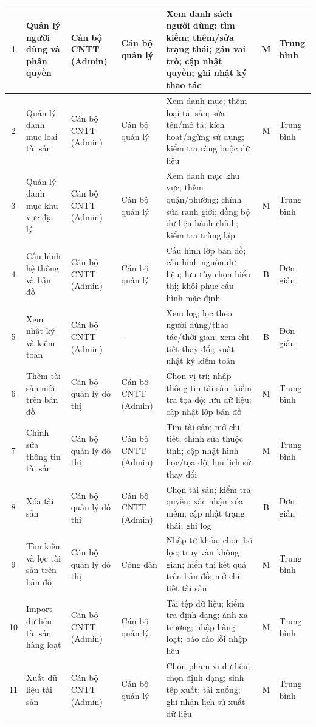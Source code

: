 \begin{longtable}{|c|p{3.2cm}|p{2.0cm}|p{2.0cm}|p{4.8cm}|c|p{1.5cm}|}
    1 & Quản lý người dùng và phân quyền & Cán bộ CNTT (Admin) & Cán bộ quản lý & Xem danh sách người dùng; tìm kiếm; thêm/sửa trạng thái; gán vai trò; cập nhật quyền; ghi nhật ký thao tác & M & Trung bình \\ \hline
    2 & Quản lý danh mục loại tài sản & Cán bộ CNTT (Admin) & Cán bộ quản lý & Xem danh mục; thêm loại tài sản; sửa tên/mô tả; kích hoạt/ngừng sử dụng; kiểm tra ràng buộc dữ liệu & M & Trung bình \\ \hline
    3 & Quản lý danh mục khu vực địa lý & Cán bộ CNTT (Admin) & Cán bộ quản lý & Xem danh mục khu vực; thêm quận/phường; chỉnh sửa ranh giới; đồng bộ dữ liệu hành chính; kiểm tra trùng lặp & M & Trung bình \\ \hline
    4 & Cấu hình hệ thống và bản đồ & Cán bộ CNTT (Admin) & Cán bộ quản lý & Cấu hình lớp bản đồ; cấu hình nguồn dữ liệu; lưu tùy chọn hiển thị; khôi phục cấu hình mặc định & B & Đơn giản \\ \hline
    5 & Xem nhật ký và kiểm toán & Cán bộ CNTT (Admin) & -- & Xem log; lọc theo người dùng/thao tác/thời gian; xem chi tiết thay đổi; xuất nhật ký kiểm toán & B & Đơn giản \\ \hline
    6 & Thêm tài sản mới trên bản đồ & Cán bộ quản lý đô thị & Cán bộ CNTT (Admin) & Chọn vị trí; nhập thông tin tài sản; kiểm tra tọa độ; lưu dữ liệu; cập nhật lớp bản đồ & M & Trung bình \\ \hline
    7 & Chỉnh sửa thông tin tài sản & Cán bộ quản lý đô thị & Cán bộ CNTT (Admin) & Tìm tài sản; mở chi tiết; chỉnh sửa thuộc tính; cập nhật hình học/tọa độ; lưu lịch sử thay đổi & M & Trung bình \\ \hline
    8 & Xóa tài sản & Cán bộ quản lý đô thị & Cán bộ CNTT (Admin) & Chọn tài sản; kiểm tra quyền; xác nhận xóa mềm; cập nhật trạng thái; ghi log & B & Đơn giản \\ \hline
    9 & Tìm kiếm và lọc tài sản trên bản đồ & Cán bộ quản lý đô thị & Công dân & Nhập từ khóa; chọn bộ lọc; truy vấn không gian; hiển thị kết quả trên bản đồ; mở chi tiết tài sản & M & Trung bình \\ \hline
    10 & Import dữ liệu tài sản hàng loạt & Cán bộ CNTT (Admin) & Cán bộ quản lý & Tải tệp dữ liệu; kiểm tra định dạng; ánh xạ trường; nhập hàng loạt; báo cáo lỗi nhập liệu & M & Trung bình \\ \hline
    11 & Xuất dữ liệu tài sản & Cán bộ CNTT (Admin) & Cán bộ quản lý & Chọn phạm vi dữ liệu; chọn định dạng; sinh tệp xuất; tải xuống; ghi nhận lịch sử xuất dữ liệu & M & Trung bình \\ \hline

\end{longtable}
